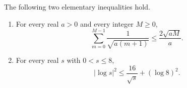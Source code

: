 \begin{lemma}
The following two elementary inequalities hold.
\begin{enumerate}
\item For every real $a>0$ and every integer $M\ge 0$,
\begin{equation}\label{eq:sslsb-harm}
  \sum_{m=0}^{M-1}\frac{1}{\sqrt{a(m+1)}}\le\frac{2\sqrt{aM}}{a}.
\end{equation}
\item For every real $s$ with $0<s\le 8$,
\begin{equation}\label{eq:sslsb-log}
  |\log s|^2\le\frac{16}{\sqrt{s}}+(\log 8)^2 .
\end{equation}
\end{enumerate}
\end{lemma}
